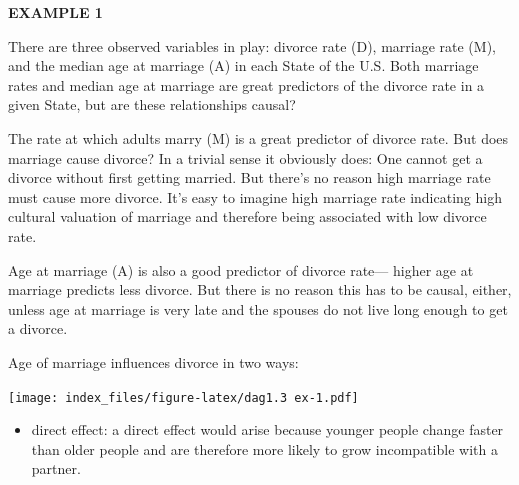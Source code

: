 \documentclass[
]{article}
\newenvironment{Shaded}{\begin{snugshade}}{\end{snugshade}}
\newcommand{\CommentTok}[1]{\textcolor[rgb]{0.56,0.35,0.01}{\textit{#1}}}
\newcommand{\KeywordTok}[1]{\textcolor[rgb]{0.13,0.29,0.53}{\textbf{#1}}}
\newcommand{\NormalTok}[1]{#1}
\newcommand{\OperatorTok}[1]{\textcolor[rgb]{0.81,0.36,0.00}{\textbf{#1}}}
\newcommand{\StringTok}[1]{\textcolor[rgb]{0.31,0.60,0.02}{#1}}
\providecommand{\tightlist}{%
  \setlength{\itemsep}{0pt}\setlength{\parskip}{0pt}}
\begin{document}
\begin{Shaded}
\end{Shaded}

\textbf{EXAMPLE 1}

There are three observed variables in play: divorce rate (D), marriage
rate (M), and the median age at marriage (A) in each State of the U.S.
Both marriage rates and median age at marriage are great predictors of
the divorce rate in a given State, but are these relationships causal?

The rate at which adults marry (M) is a great predictor of divorce rate.
But does marriage cause divorce? In a trivial sense it obviously does:
One cannot get a divorce without first getting married. But there's no
reason high marriage rate must cause more divorce. It's easy to imagine
high marriage rate indicating high cultural valuation of marriage and
therefore being associated with low divorce rate.

Age at marriage (A) is also a good predictor of divorce rate--- higher
age at marriage predicts less divorce. But there is no reason this has
to be causal, either, unless age at marriage is very late and the
spouses do not live long enough to get a divorce.

Age of marriage influences divorce in two ways:

\texttt{[image: index\_files/figure-latex/dag1.3 ex-1.pdf]}

\begin{itemize}
\tightlist
\item
  direct effect: a direct effect would arise because younger people
  change faster than older people and are therefore more likely to grow
  incompatible with a partner.
\end{itemize}
\end{document}
